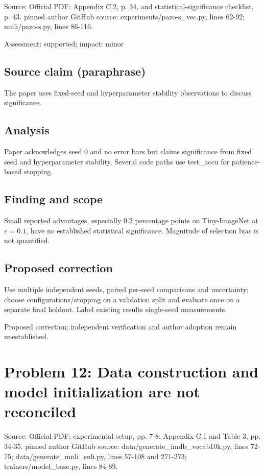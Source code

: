 \documentclass[11pt]{article}
\begin{document}
Source: Official PDF: Appendix C.2, p. 34, and statistical-significance checklist, p. 43. pinned author GitHub source: experiments/pazo-s\_vec.py, lines 62-92; mnli/pazo-s.py, lines 86-116.

Assessment: supported; impact: minor

\subsection*{Source claim (paraphrase)}

The paper uses fixed-seed and hyperparameter stability observations to discuss significance.

\subsection*{Analysis}

Paper acknowledges seed \(0\) and no error bars but claims significance from fixed seed and hyperparameter stability. Several code paths use test\_accu for patience-based stopping.

\subsection*{Finding and scope}

Small reported advantages, especially \(0.2\) percentage points on Tiny-ImageNet at \(\varepsilon=0.1\), have no established statistical significance. Magnitude of selection bias is not quantified.

\subsection*{Proposed correction}

Use multiple independent seeds, paired per-seed comparisons and uncertainty; choose configurations/stopping on a validation split and evaluate once on a separate final holdout. Label existing results single-seed measurements.

Proposed correction; independent verification and author adoption remain unestablished.

\section*{Problem 12: Data construction and model initialization are not reconciled}

Source: Official PDF: experimental setup, pp. 7-8; Appendix C.1 and Table 3, pp. 34-35. pinned author GitHub source: data/generate\_imdb\_vocab10k.py, lines 72-75; data/generate\_mnli\_snli.py, lines 57-108 and 271-273; trainers/model\_base.py, lines 84-89.
\end{document}

